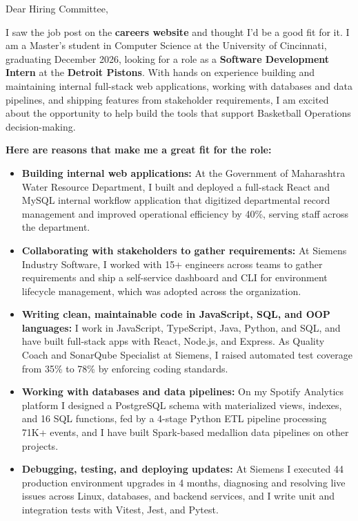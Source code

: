 \documentclass[11pt]{letter}
\date{}
\begin{document}
\begin{letter}{}

\opening{Dear Hiring Committee,}

I saw the job post on the \textbf{careers website} and thought I'd be a good fit for it. I am a Master's student in Computer Science at the University of Cincinnati, graduating December 2026, looking for a role as a \textbf{Software Development Intern} at the \textbf{Detroit Pistons}. With hands on experience building and maintaining internal full-stack web applications, working with databases and data pipelines, and shipping features from stakeholder requirements, I am excited about the opportunity to help build the tools that support Basketball Operations decision-making.

\textbf{Here are reasons that make me a great fit for the role:}

\begin{itemize}[leftmargin=*, itemsep=0.4em]
    \item \textbf{Building internal web applications:} At the Government of Maharashtra Water Resource Department, I built and deployed a full-stack React and MySQL internal workflow application that digitized departmental record management and improved operational efficiency by 40\%, serving staff across the department.

    \item \textbf{Collaborating with stakeholders to gather requirements:} At Siemens Industry Software, I worked with 15+ engineers across teams to gather requirements and ship a self-service dashboard and CLI for environment lifecycle management, which was adopted across the organization.

    \item \textbf{Writing clean, maintainable code in JavaScript, SQL, and OOP languages:} I work in JavaScript, TypeScript, Java, Python, and SQL, and have built full-stack apps with React, Node.js, and Express. As Quality Coach and SonarQube Specialist at Siemens, I raised automated test coverage from 35\% to 78\% by enforcing coding standards.

    \item \textbf{Working with databases and data pipelines:} On my Spotify Analytics platform I designed a PostgreSQL schema with materialized views, indexes, and 16 SQL functions, fed by a 4-stage Python ETL pipeline processing 71K+ events, and I have built Spark-based medallion data pipelines on other projects.

    \item \textbf{Debugging, testing, and deploying updates:} At Siemens I executed 44 production environment upgrades in 4 months, diagnosing and resolving live issues across Linux, databases, and backend services, and I write unit and integration tests with Vitest, Jest, and Pytest.
\end{itemize}


\end{letter}
\end{document}
